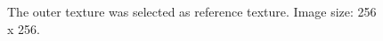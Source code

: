 \begin{figure}
\begin{minipage}[t]{0.32\linewidth}
	\end{minipage}
	\begin{minipage}[t]{0.32\linewidth}
		\centering
	\end{minipage}
	\caption{The outer texture was selected as reference texture. Image size: 256 x 256.}
	\label{fig:TestImage1}
\end{figure}


